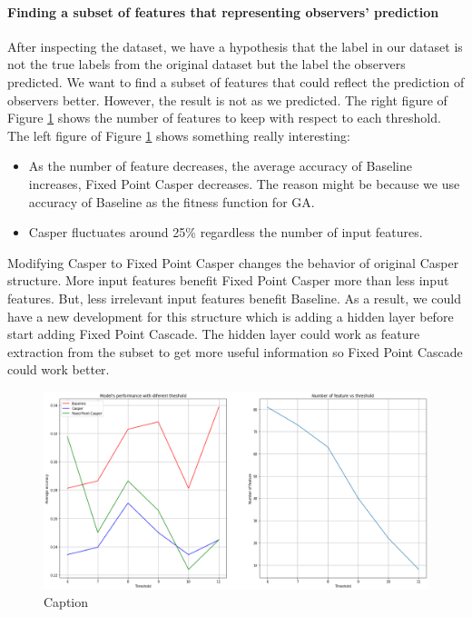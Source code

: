 \documentclass[runningheads]{llncs}
\begin{document}
\paragraph{\textbf{Finding a subset of features that representing observers' prediction}} After inspecting the dataset, we have a hypothesis that the label in our dataset is not the true labels from the original dataset but the label the observers predicted. We want to find a subset of features that could reflect the prediction of observers better. However, the result is not as we predicted. The right figure of Figure \ref{fig:threshold} shows the number of features to keep with respect to each threshold. The left figure of Figure \ref{fig:threshold} shows something really interesting:
\begin{itemize}
    \item As the number of feature decreases, the average accuracy of Baseline increases, Fixed Point Casper decreases. The reason might be because we use accuracy of Baseline as the fitness function for  GA.
    \item Casper fluctuates around 25\% regardless the number of input features.
\end{itemize}
Modifying Casper to Fixed Point Casper changes the behavior of original Casper structure. More input features benefit Fixed Point Casper more than less input features. But, less irrelevant input features benefit Baseline. As a result, we could have a new development for this structure which is adding a hidden layer before start adding Fixed Point Cascade. The hidden layer could work as feature extraction from the subset to get more useful information so Fixed Point Cascade could work better.
\begin{figure}
    \centering
    \includegraphics[width=\textwidth]{threshold.PNG}
    \caption{Caption}
    \label{fig:threshold}
\end{figure}
\end{document}
